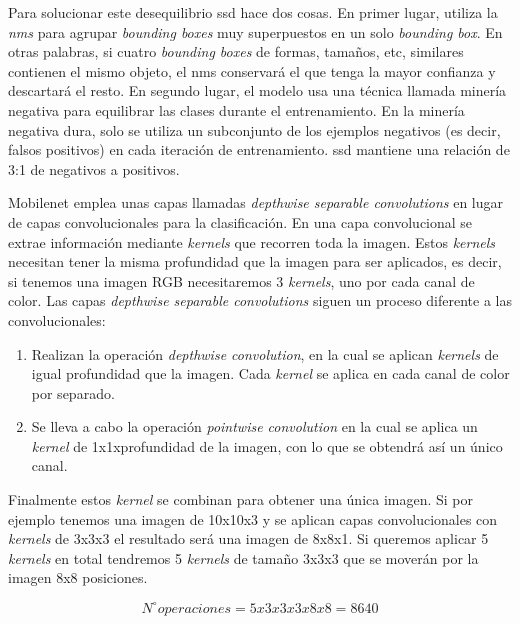 Para solucionar este desequilibrio \acrshort{ssd} hace dos cosas. En primer lugar, utiliza la \textit{\acrfull{nms}} para agrupar \textit{bounding boxes} muy superpuestos en un solo \textit{bounding box}. En otras palabras, si cuatro \textit{bounding boxes} de formas, tamaños, etc, similares contienen el mismo objeto, el \acrshort{nms} conservará el que tenga la mayor confianza y descartará el resto. En segundo lugar, el modelo usa una técnica llamada minería negativa para equilibrar las clases durante el entrenamiento. En la minería negativa dura, solo se utiliza un subconjunto de los ejemplos negativos (es decir, falsos positivos) en cada iteración de entrenamiento. \acrshort{ssd} mantiene una relación de 3:1 de negativos a positivos.


Mobilenet emplea unas capas llamadas \textit{depthwise separable convolutions} en lugar de capas convolucionales para la clasificación. En una capa convolucional se extrae información mediante \textit{kernels} que recorren toda la imagen. Estos \textit{kernels} necesitan tener la misma profundidad que la imagen para ser aplicados, es decir, si tenemos una imagen RGB necesitaremos 3 \textit{kernels}, uno por cada canal de color. Las capas \textit{depthwise separable convolutions} siguen un proceso diferente a las convolucionales: 

\begin{enumerate}
    \item Realizan la operación \textit{depthwise convolution}, en la cual se aplican \textit{kernels} de igual profundidad que la imagen. Cada \textit{kernel} se aplica en cada canal de color por separado.
    \item Se lleva a cabo la operación \textit{pointwise convolution} en la cual se aplica un \textit{kernel} de 1x1xprofundidad de la imagen, con lo que se obtendrá así un único canal.
\end{enumerate}

Finalmente estos \textit{kernel} se combinan para obtener una única imagen. 
Si por ejemplo tenemos una imagen de 10x10x3 y se aplican capas convolucionales con \textit{kernels} de 3x3x3 el resultado será una imagen de 8x8x1. Si queremos aplicar 5 \textit{kernels} en total tendremos 5 \textit{kernels} de tamaño 3x3x3 que se moverán por la imagen 8x8 posiciones.

\begin{equation}\label{convolucional_formula}
N^{\circ} operaciones = 5x3x3x3x8x8 = 8640
\end{equation}

